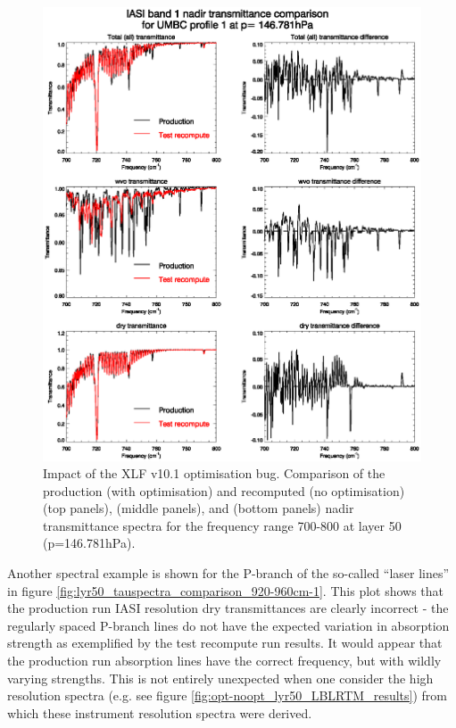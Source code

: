 \begin{figure}[htp]
  \centering
  \includegraphics[scale=0.8]{graphics/lyr50_tauspectra_comparison_700-800cm-1.eps}
  \caption{Impact of the XLF v10.1 optimisation bug. Comparison of the production (with optimisation) and recomputed (no optimisation)  (top panels),  (middle panels), and  (bottom panels) nadir transmittance spectra for the frequency range 700-800\invcm{} at layer 50 (p=146.781hPa).}
  \label{fig:lyr50_tauspectra_comparison_700-800cm-1}
\end{figure}
Another spectral example is shown for the P-branch of the so-called \carbondioxide{} ``laser lines'' in figure \ref{fig:lyr50_tauspectra_comparison_920-960cm-1}. This plot shows that the production run IASI resolution dry transmittances are clearly incorrect - the regularly spaced \carbondioxide{} P-branch lines do not have the expected variation in absorption strength as exemplified by the test recompute run results. It would appear that the production run absorption lines have the correct frequency, but with wildly varying strengths. This is not entirely unexpected when one consider the high resolution spectra (e.g. see figure \ref{fig:opt-noopt_lyr50_LBLRTM_results}) from which these instrument resolution spectra were derived.

